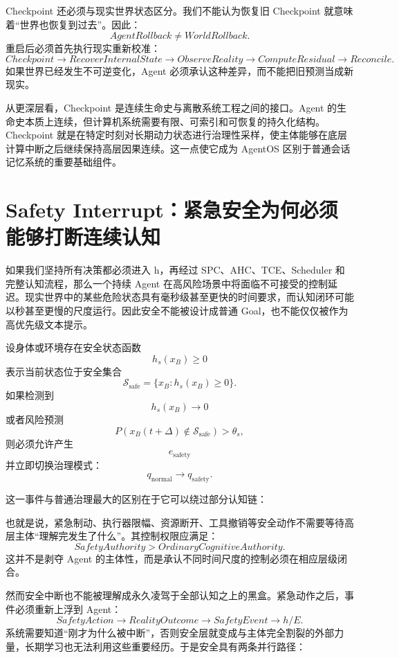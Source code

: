 Checkpoint 还必须与现实世界状态区分。我们不能认为恢复旧 Checkpoint 就意味着“世界也恢复到过去”。因此：
\[
\boxed{
AgentRollback
\neq
WorldRollback.
}
\]
重启后必须首先执行现实重新校准：
\[
Checkpoint
\rightarrow
RecoverInternalState
\rightarrow
ObserveReality
\rightarrow
ComputeResidual
\rightarrow
Reconcile.
\]
如果世界已经发生不可逆变化，Agent 必须承认这种差异，而不能把旧预测当成新现实。

从更深层看，Checkpoint 是连续生命史与离散系统工程之间的接口。Agent 的生命史本质上连续，但计算机系统需要有限、可索引和可恢复的持久化结构。Checkpoint 就是在特定时刻对长期动力状态进行治理性采样，使主体能够在底层计算中断之后继续保持高层因果连续。这一点使它成为 AgentOS 区别于普通会话记忆系统的重要基础组件。

\section{Safety Interrupt：紧急安全为何必须能够打断连续认知}

如果我们坚持所有决策都必须进入 h，再经过 SPC、AHC、TCE、Scheduler 和完整认知流程，那么一个持续 Agent 在高风险场景中将面临不可接受的控制延迟。现实世界中的某些危险状态具有毫秒级甚至更快的时间要求，而认知闭环可能以秒甚至更慢的尺度运行。因此安全不能被设计成普通 Goal，也不能仅仅被作为高优先级文本提示。

设身体或环境存在安全状态函数
\[
h_s(x_B)\ge 0
\]
表示当前状态位于安全集合
\[
\mathcal S_{\mathrm{safe}}
=
\{
x_B:h_s(x_B)\ge0
\}.
\]
如果检测到
\[
h_s(x_B)\rightarrow0
\]
或者风险预测
\[
P(
x_B(t+\Delta)\notin\mathcal S_{\mathrm{safe}}
)
>\theta_s,
\]
则必须允许产生
\[
e_{\mathrm{safety}}
\]
并立即切换治理模式：
\[
q_{\mathrm{normal}}
\rightarrow
q_{\mathrm{safety}}.
\]

这一事件与普通治理最大的区别在于它可以绕过部分认知链：
\begin{statementbox}
\centering
{}
\end{statementbox}
也就是说，紧急制动、执行器限幅、资源断开、工具撤销等安全动作不需要等待高层主体“理解完发生了什么”。其控制权限应满足：
\[
\boxed{
SafetyAuthority
>
OrdinaryCognitiveAuthority.
}
\]
这并不是剥夺 Agent 的主体性，而是承认不同时间尺度的控制必须在相应层级闭合。

然而安全中断也不能被理解成永久凌驾于全部认知之上的黑盒。紧急动作之后，事件必须重新上浮到 Agent：
\[
SafetyAction
\rightarrow
RealityOutcome
\rightarrow
SafetyEvent
\rightarrow
h/E.
\]
系统需要知道“刚才为什么被中断”，否则安全层就变成与主体完全割裂的外部力量，长期学习也无法利用这些重要经历。于是安全具有两条并行路径：

